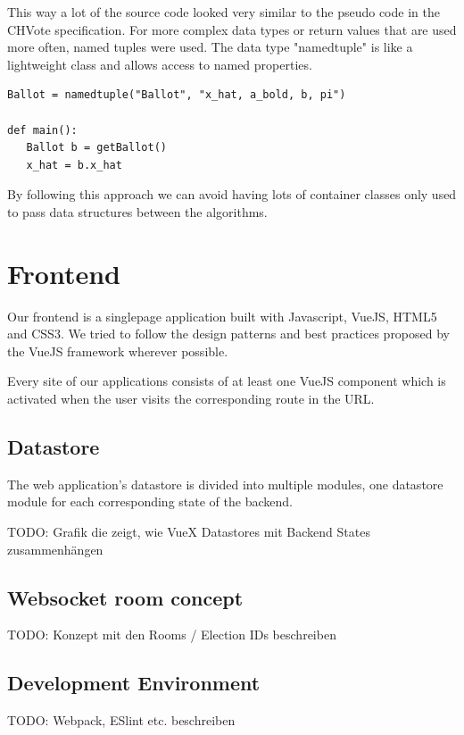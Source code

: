 This way a lot of the source code looked very similar to the pseudo code in the CHVote specification. For more complex data types or return values that are used more often, named tuples were used. The data type "namedtuple" is like a lightweight class and allows access to named properties.

\begin{verbatim}
Ballot = namedtuple("Ballot", "x_hat, a_bold, b, pi")

def main():
   Ballot b = getBallot()
   x_hat = b.x_hat
\end{verbatim}

By following this approach we can avoid having lots of container classes only used to pass data structures between the algorithms.

\section{Frontend}
Our frontend is a singlepage application built with Javascript, VueJS, HTML5 and CSS3. We tried to follow the design patterns and best practices proposed by the VueJS framework wherever possible.

Every site of our applications consists of at least one VueJS component which is activated when the user visits the corresponding route in the URL.
\subsection{Datastore}
The web application's datastore is divided into multiple modules, one datastore module for each corresponding state of the backend.

TODO: Grafik die zeigt, wie VueX Datastores mit Backend States zusammenhängen
 
\subsection{Websocket room concept}
TODO: Konzept mit den Rooms / Election IDs beschreiben

\subsection{Development Environment}
TODO: Webpack, ESlint etc. beschreiben